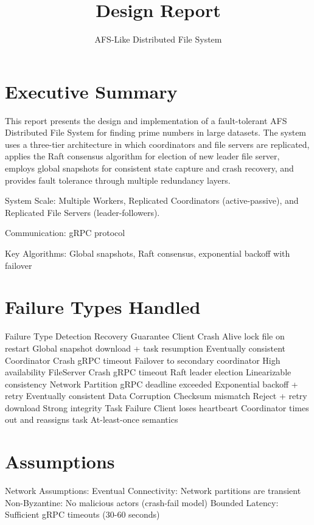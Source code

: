 \documentclass[11pt, a4paper]{article}
\title{Design Report }
\author{ AFS-Like Distributed File System}
\date{}
\begin{document}
\maketitle
\thispagestyle{empty}
\pagestyle{headings}


\section{Executive Summary}

This report presents the design and implementation of a fault-tolerant AFS Distributed File System for finding prime numbers in large datasets. The system uses a three-tier architecture in which coordinators and file servers are replicated, applies the Raft consensus algorithm for election of new leader file server, employs global snapshots for consistent state capture and crash recovery, and provides fault tolerance through multiple redundancy layers.

System Scale: Multiple Workers, Replicated Coordinators (active-passive), and Replicated File Servers (leader-followers).

Communication: gRPC protocol

Key Algorithms: Global snapshots, Raft consensus, exponential backoff with failover

\section{Failure Types Handled}

Failure Type		Detection				        Recovery									    Guarantee
Client Crash		Alive lock file on restart	    Global snapshot download + task resumption	    Eventually consistent
Coordinator Crash	gRPC timeout		            Failover to secondary coordinator			    High availability
FileServer Crash	gRPC timeout				    Raft leader election						    Linearizable consistency
Network Partition	gRPC deadline exceeded	        Exponential backoff + retry					    Eventually consistent
Data Corruption		Checksum mismatch		        Reject + retry download						    Strong integrity
Task Failure		Client loses heartbeart	        Coordinator times out and reassigns task		At-least-once semantics

\section{Assumptions}

Network Assumptions:
Eventual Connectivity:  Network partitions are transient
Non-Byzantine:          No malicious actors (crash-fail model)
Bounded Latency:        Sufficient gRPC timeouts (30-60 seconds)
\end{document}
